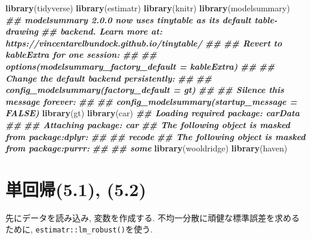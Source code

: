 \documentclass[
]{book}
\newenvironment{Shaded}{\begin{snugshade}}{\end{snugshade}}
\newcommand{\DocumentationTok}[1]{\textcolor[rgb]{0.56,0.35,0.01}{\textbf{\textit{#1}}}}
\newcommand{\FunctionTok}[1]{\textcolor[rgb]{0.13,0.29,0.53}{\textbf{#1}}}
\newcommand{\NormalTok}[1]{#1}
\begin{document}
\begin{Shaded}
\begin{Highlighting}[]
\FunctionTok{library}\NormalTok{(tidyverse)}
\FunctionTok{library}\NormalTok{(estimatr)}
\FunctionTok{library}\NormalTok{(knitr)}
\FunctionTok{library}\NormalTok{(modelsummary)}
\DocumentationTok{\#\# \textasciigrave{}modelsummary\textasciigrave{} 2.0.0 now uses \textasciigrave{}tinytable\textasciigrave{} as its default table{-}drawing}
\DocumentationTok{\#\#   backend. Learn more at: https://vincentarelbundock.github.io/tinytable/}
\DocumentationTok{\#\# }
\DocumentationTok{\#\# Revert to \textasciigrave{}kableExtra\textasciigrave{} for one session:}
\DocumentationTok{\#\# }
\DocumentationTok{\#\#   options(modelsummary\_factory\_default = \textquotesingle{}kableExtra\textquotesingle{})}
\DocumentationTok{\#\# }
\DocumentationTok{\#\# Change the default backend persistently:}
\DocumentationTok{\#\# }
\DocumentationTok{\#\#   config\_modelsummary(factory\_default = \textquotesingle{}gt\textquotesingle{})}
\DocumentationTok{\#\# }
\DocumentationTok{\#\# Silence this message forever:}
\DocumentationTok{\#\# }
\DocumentationTok{\#\#   config\_modelsummary(startup\_message = FALSE)}
\FunctionTok{library}\NormalTok{(gt)}
\FunctionTok{library}\NormalTok{(car)}
\DocumentationTok{\#\# Loading required package: carData}
\DocumentationTok{\#\# }
\DocumentationTok{\#\# Attaching package: \textquotesingle{}car\textquotesingle{}}
\DocumentationTok{\#\# The following object is masked from \textquotesingle{}package:dplyr\textquotesingle{}:}
\DocumentationTok{\#\# }
\DocumentationTok{\#\#     recode}
\DocumentationTok{\#\# The following object is masked from \textquotesingle{}package:purrr\textquotesingle{}:}
\DocumentationTok{\#\# }
\DocumentationTok{\#\#     some}
\FunctionTok{library}\NormalTok{(wooldridge)}
\FunctionTok{library}\NormalTok{(haven)}
\end{Highlighting}
\end{Shaded}

\hypertarget{ux5358ux56deux5e305.1-5.2}{%
\section*{単回帰(5.1), (5.2)}\label{ux5358ux56deux5e305.1-5.2}}

先にデータを読み込み, 変数を作成する. 不均一分散に頑健な標準誤差を求めるために, \texttt{estimatr::lm\_robust()}を使う.
\end{document}
